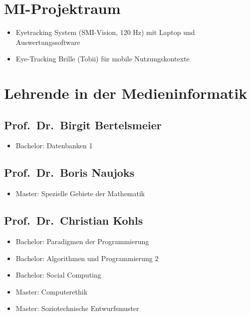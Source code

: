 \section{MI-Projektraum}\label{mi-projektraum}

\begin{itemize}
\tightlist
\item
  Eyetracking System (SMI-Vision, 120 Hz) mit Laptop und
  Auswertungssoftware
\item
  Eye-Tracking Brille (Tobii) für mobile Nutzungskontexte
\end{itemize}

\section{Lehrende in der
Medieninformatik}\label{lehrende-in-der-medieninformatik}

\subsection{Prof.~Dr.~Birgit
Bertelsmeier}\label{prof.dr.birgit-bertelsmeier}

\begin{itemize}
\tightlist
\item
  Bachelor: Datenbanken 1
\end{itemize}

\subsection{Prof.~Dr.~Boris Naujoks}\label{prof.dr.boris-naujoks}

\begin{itemize}
\tightlist
\item
  Master: Spezielle Gebiete der Mathematik
\end{itemize}

\subsection{Prof.~Dr.~Christian Kohls}\label{prof.dr.christian-kohls}

\begin{itemize}
\tightlist
\item
  Bachelor: Paradigmen der Programmierung
\item
  Bachelor: Algorithmen und Programmierung 2
\item
  Bachelor: Social Computing
\item
  Master: Computerethik
\item
  Master: Soziotechnische Entwurfsmuster
\end{itemize}

